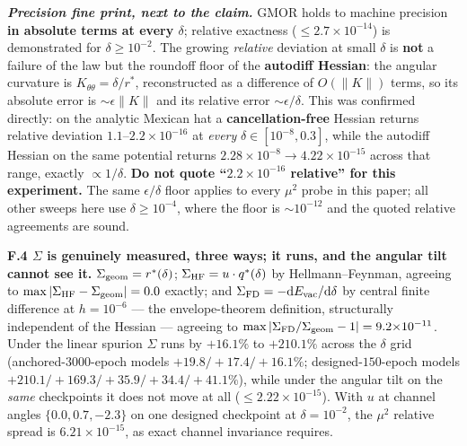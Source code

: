 \documentclass{article}
\begin{document}
\emph{\textbf{Precision fine print, next to the claim.}} GMOR holds to machine precision \textbf{in absolute terms at every $\delta$}; relative exactness ($\le2.7{\times}10^{-14}$) is demonstrated for $\delta\ge10^{-2}$. The growing \emph{relative} deviation at small $\delta$ is \textbf{not} a failure of the law but the roundoff floor of the \textbf{autodiff Hessian}: the angular curvature is $K_{\theta\theta}=\delta/r^*$, reconstructed as a difference of $O(\lVert K\rVert)$ terms, so its absolute error is $\sim\epsilon\lVert K\rVert$ and its relative error $\sim\epsilon/\delta$. This was confirmed directly: on the analytic Mexican hat a \textbf{cancellation-free} Hessian returns relative deviation $1.1$--$2.2{\times}10^{-16}$ at \emph{every} $\delta\in[10^{-8},0.3]$, while the autodiff Hessian on the same potential returns $2.28{\times}10^{-8}\to4.22{\times}10^{-15}$ across that range, exactly $\propto1/\delta$. \textbf{Do not quote ``$2.2{\times}10^{-16}$ relative'' for this experiment.} The same $\epsilon/\delta$ floor applies to every $\mu^2$ probe in this paper; all other sweeps here use $\delta\ge10^{-4}$, where the floor is $\sim10^{-12}$ and the quoted relative agreements are sound.

\textbf{F.4 $\Sigma$ is genuinely measured, three ways; it runs, and the angular tilt cannot see it.} $\Sigma_{\rm geom}=r^*(\delta)$; $\Sigma_{\rm HF}=u\cdot q^*(\delta)$ by Hellmann--Feynman, agreeing to $\max|\Sigma_{\rm HF}-\Sigma_{\rm geom}|=0.0$ exactly; and $\Sigma_{\rm FD}=-\mathrm{d}E_{\rm vac}/\mathrm{d}\delta$ by central finite difference at $h{=}10^{-6}$ --- the envelope-theorem definition, structurally independent of the Hessian --- agreeing to $\max|\Sigma_{\rm FD}/\Sigma_{\rm geom}-1|=9.2{\times}10^{-11}$. Under the linear spurion $\Sigma$ runs by $+16.1\%$ to $+210.1\%$ across the $\delta$ grid (anchored-$3000$-epoch models $+19.8/+17.4/+16.1\%$; designed-$150$-epoch models $+210.1/+169.3/+35.9/+34.4/+41.1\%$), while under the angular tilt on the \emph{same} checkpoints it does not move at all ($\le2.22{\times}10^{-15}$). With $u$ at channel angles $\{0.0,0.7,-2.3\}$ on one designed checkpoint at $\delta{=}10^{-2}$, the $\mu^2$ relative spread is $6.21{\times}10^{-15}$, as exact channel invariance requires.
\end{document}
